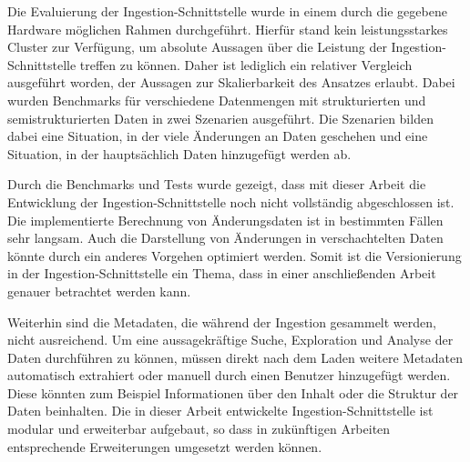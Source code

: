 Die Evaluierung der Ingestion-Schnittstelle wurde in einem durch die gegebene Hardware möglichen Rahmen durchgeführt.
Hierfür stand kein leistungsstarkes Cluster zur Verfügung, um absolute Aussagen über die Leistung der Ingestion-Schnittstelle treffen zu können.
Daher ist lediglich ein relativer Vergleich ausgeführt worden, der Aussagen zur Skalierbarkeit des Ansatzes erlaubt.
Dabei wurden Benchmarks für verschiedene Datenmengen mit strukturierten und semistrukturierten Daten in zwei Szenarien ausgeführt.
Die Szenarien bilden dabei eine Situation, in der viele Änderungen an Daten geschehen und eine Situation, in der hauptsächlich Daten hinzugefügt werden ab.

Durch die Benchmarks und Tests wurde gezeigt, dass mit dieser Arbeit die Entwicklung der Ingestion-Schnittstelle noch nicht vollständig abgeschlossen ist.
Die implementierte Berechnung von Änderungsdaten ist in bestimmten Fällen sehr langsam.
Auch die Darstellung von Änderungen in verschachtelten Daten könnte durch ein anderes Vorgehen optimiert werden.
Somit ist die Versionierung in der Ingestion-Schnittstelle ein Thema, dass in einer anschließenden Arbeit genauer betrachtet werden kann.

Weiterhin sind die Metadaten, die während der Ingestion gesammelt werden, nicht ausreichend.
Um eine aussagekräftige Suche, Exploration und Analyse der Daten durchführen zu können, müssen direkt nach dem Laden weitere Metadaten automatisch extrahiert oder manuell durch einen Benutzer hinzugefügt werden.
Diese könnten zum Beispiel Informationen über den Inhalt oder die Struktur der Daten beinhalten.
Die in dieser Arbeit entwickelte Ingestion-Schnittstelle ist modular und erweiterbar aufgebaut, so dass in zukünftigen Arbeiten entsprechende Erweiterungen umgesetzt werden können.